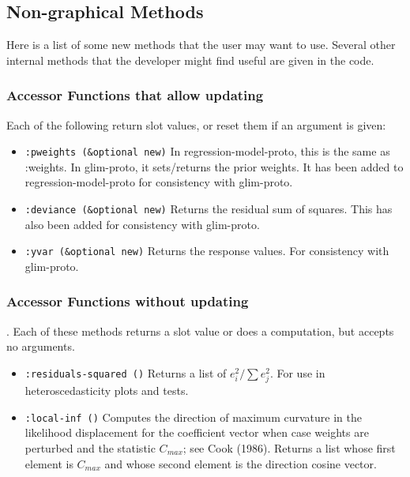 \subsection{Non-graphical Methods}
	Here is a list of some new methods that the user may
want to use.  Several other internal methods that the developer might find
useful are given in the code.

\subsubsection {Accessor Functions that allow updating}  
Each of the following return 
slot values, or reset them if an argument is given:
\begin{itemize}
\item {\tt :pweights (\&optional new)} In regression-model-proto, 
this is the same 
as :weights.  In glim-proto, it sets/returns the prior weights.  It has been 
added to regression-model-proto for consistency with glim-proto.
\item {\tt :deviance (\&optional new)} Returns the residual sum of 
squares.  This has also
been added for consistency with glim-proto.
\item {\tt :yvar (\&optional new)} Returns the response values.  
For consistency with glim-proto.
\end{itemize}

\subsubsection {Accessor Functions without updating}.  Each of these methods returns a
slot value or does a computation, but accepts no arguments.
\begin{itemize}
\item {\tt :residuals-squared ()} Returns a list of $e_i^2/\sum e_j^2$.  For use
in heteroscedasticity plots and tests.
\item {\tt :local-inf ()} Computes the direction of maximum curvature
in the likelihood displacement for the coefficient vector when case weights
are perturbed and the statistic $C_{max}$; see Cook (1986).
Returns a list whose first element is $C_{max}$
and whose second element is the direction cosine vector.  
\end{itemize}

